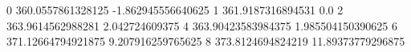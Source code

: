 0 360.0557861328125 -1.862945556640625
1 361.9187316894531 0.0
2 363.9614562988281 2.042724609375
4 363.90423583984375 1.985504150390625
6 371.12664794921875 9.207916259765625
8 373.8124694824219 11.89373779296875
